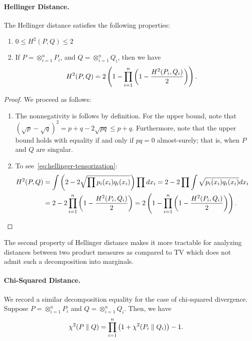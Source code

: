 \documentclass[12pt]{article}
\begin{document}
\paragraph{Hellinger Distance.} The Hellinger distance satisfies the following properties: 
		\begin{enumerate}
			\item $0 \leq H^2(P, Q) \leq 2$
			\item If $P = \otimes_{i=1}^n P_i$, and $Q = \otimes_{i=1}^n Q_i$, then we have 
			\begin{align}
				H^2(P, Q) = 2 \left( 1 - \prod_{i=1}^n \left( 1 - \frac{H^2(P_i, Q_i)}{2} \right) \right). \label{eq:hellinger-tensorization}
			\end{align}
		\end{enumerate}

\begin{proof}We proceed as follows:
\begin{enumerate}
	\item The nonnegativity is follows by definition. For the upper bound, note that $(\sqrt{p} - \sqrt{q})^2 = p + q - 2\sqrt{pq} \leq p + q$. Furthermore, note that the upper bound holds with equality if and only if $pq=0$ almost-surely; that is, when $P$ and $Q$ are singular. 
	\item To see~\eqref{eq:hellinger-tensorization}: 
	\begin{align}
		H^2(P, Q) &= \int \left( 2 - 2 \sqrt{\prod p_i(x_i) q_i(x_i)} \right) \prod dx_i  = 2 - 2\prod \int \sqrt{p_i(x_i) q_i(x_i)} dx_i \\
		& = 2 - 2 \prod_{i=1}^n \left( 1 - \frac{H^2(P_i, Q_i)}{2} \right) = 2\left( 1 -  \prod_{i=1}^n \left( 1 - \frac{H^2(P_i, Q_i)}{2} \right) \right). 
	\end{align}
\end{enumerate}
\end{proof}

The second property of Hellinger distance makes it more tractable for analyzing distances between two product measures as compared to TV which does not admit such a decomposition into marginals. 

\paragraph{Chi-Squared Distance.} We record a similar decomposition equality for the case of chi-squared divergence. 
	Suppose $P = \otimes_{i=1}^n P_i$ and $Q = \otimes_{i=1}^n Q_i$. Then, we have 
	\begin{align}
		\chi^2(P \parallel Q) = \prod_{i=1}^n \left( 1 + \chi^2(P_i \parallel Q_i) \right) - 1. 
	\end{align}
\end{document}
